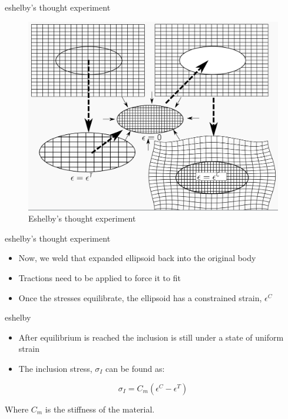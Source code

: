 \documentclass[
  letterpaper,
  ignorenonframetext,
  aspectratio=43,
  handout,
  12pt]{beamer}
\providecommand{\tightlist}{%
  \setlength{\itemsep}{0pt}\setlength{\parskip}{0pt}}
\providecommand{\tightlist}{%
\setlength{\itemsep}{0pt}\setlength{\parskip}{0pt}}
\let\Oldincludegraphics\includegraphics
\renewcommand{\includegraphics}[2][]{\Oldincludegraphics[width=\textwidth,height=0.7\textheight,keepaspectratio]{#2}}
\begin{document}
\begin{frame}{eshelby's thought experiment}
\protect\hypertarget{eshelbys-thought-experiment-1}{}
\begin{figure}
\centering
\includegraphics{../images/eshelby.png}
\caption{Eshelby's thought experiment}
\end{figure}
\end{frame}

\begin{frame}{eshelby's thought experiment}
\protect\hypertarget{eshelbys-thought-experiment-2}{}
\begin{itemize}
\tightlist
\item
  Now, we weld that expanded ellipsoid back into the original body
\item
  Tractions need to be applied to force it to fit
\item
  Once the stresses equilibrate, the ellipsoid has a constrained strain,
  \(\epsilon^C\)
\end{itemize}
\end{frame}

\begin{frame}{eshelby}
\protect\hypertarget{eshelby-1}{}
\begin{itemize}
\tightlist
\item
  After equilibrium is reached the inclusion is still under a state of
  uniform strain
\item
  The inclusion stress, \(\sigma_I\) can be found as:
\end{itemize}

\[\sigma_I = C_m (\epsilon^C - \epsilon^T)\]

Where \(C_m\) is the stiffness of the material.
\end{frame}
\end{document}
